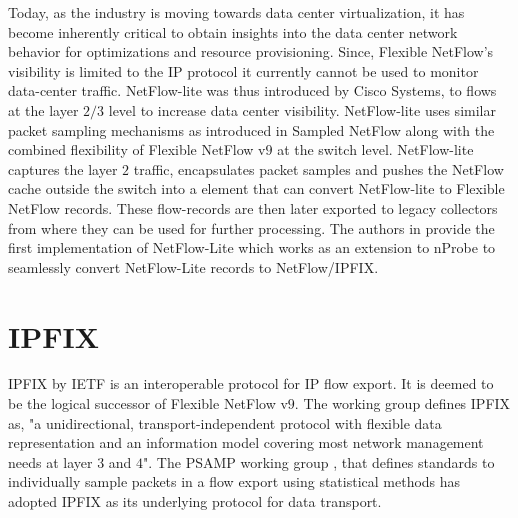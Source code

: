 Today, as the industry is moving towards data center virtualization, it has become inherently critical to obtain insights into the data center network behavior for optimizations and resource provisioning. Since, Flexible NetFlow's visibility is limited to the \ac{IP} protocol it currently cannot be used to monitor data-center traffic. NetFlow-lite was thus introduced by Cisco Systems, to flows at the layer $2/3$ level to increase data center visibility. NetFlow-lite  uses similar packet sampling mechanisms as introduced in Sampled NetFlow along with the combined flexibility of Flexible NetFlow v$9$ at the switch level. NetFlow-lite captures the layer $2$ traffic, encapsulates packet samples and pushes the NetFlow cache outside the switch into a element that can convert NetFlow-lite to Flexible NetFlow records. These flow-records are then later exported to legacy collectors from where they can be used for further processing. The authors in \cite{lderi:2011} provide the first implementation of NetFlow-Lite which works as an extension to nProbe \cite{lderi:2003} to seamlessly convert NetFlow-Lite records to NetFlow/\ac{IPFIX}.

\section{IPFIX}\label{sec:ipfix}
\ac{IPFIX} \cite{rfc5101} by \ac{IETF} is an interoperable protocol for \ac{IP} flow export. It is deemed to be the logical successor of Flexible NetFlow v$9$. The working group defines \ac{IPFIX} as, "a unidirectional, transport-independent protocol with flexible data representation and an information model covering most network management needs at layer $3$ and $4$". The \ac{PSAMP} working group \cite{rfc5476}, that defines standards to individually sample packets in a flow export using statistical methods has adopted \ac{IPFIX} as its underlying protocol for data transport.

